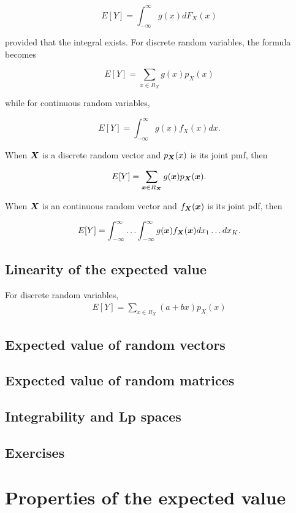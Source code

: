 \documentclass{report}
\newcommand{\RX}{R_{\bmX}}
\newcommand{\Rx}{R_X}
\begin{document}
	$$E[Y]=\int_{-\infty}^{\infty}g(x)dF_X(x)$$
	
	provided that the integral exists. For discrete random variables, the formula becomes
	
	$$E[Y]=\sum_{x\in\Rx} g(x)p_X(x)$$
	
	while for continuous random variables, 
	
	$$E[Y]=\int_{-\infty}^{\infty}g(x)f_X(x)dx.$$
	
	When $\boldsymbol{X}$ is a discrete random vector and $p_{\boldsymbol{X}}(x)$ is its joint pmf, then
	
	$$E[Y]=\sum_{\bmx\in\RX}g(\bmx)p_{\bmX}(\bmx).$$
	
	When $\boldsymbol{X}$ is an continuous random vector and $f_{\boldsymbol{X}}(\boldsymbol{x})$ is its joint pdf, then
	
	$$E[Y]=\int_{-\infty}^{\infty}\ldots\int_{-\infty}^{\infty}g(\boldsymbol{x})f_{\boldsymbol{X}}(\boldsymbol{x})dx_1\ldots dx_K.$$
	
	\subsection{Linearity of the expected value} %
	\begin{myproof}
		For discrete random variables,
		\begin{align*}
			E[Y]=\sum_{x\in\Rx}(a+bx)p_X(x)
		\end{align*}
	\end{myproof}
	
	\subsection{Expected value of random vectors} %
	\subsection{Expected value of random matrices} %
	\subsection{Integrability and Lp spaces} %
	\subsection{Exercises} %
	
	\section{Properties of the expected value}
\end{document}
